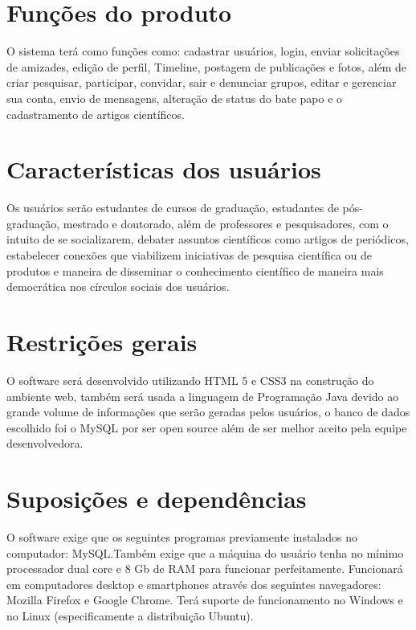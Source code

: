 \section{Funções do produto}

O sistema terá como funções como: cadastrar usuários, login, enviar solicitações de amizades, edição de perfil, Timeline, postagem de publicações e fotos, além de criar pesquisar, participar, convidar, sair e denunciar grupos, editar e gerenciar sua conta, envio de mensagens, alteração de status do bate papo e o cadastramento de artigos científicos.

\section{Características dos usuários}
Os usuários serão estudantes de cursos de graduação, estudantes de pós-graduação, mestrado e doutorado, além de professores e pesquisadores, com o intuito de se socializarem, debater assuntos científicos como artigos de periódicos, estabelecer conexões que viabilizem iniciativas de pesquisa científica ou de produtos e maneira de disseminar o conhecimento científico de maneira mais democrática nos círculos sociais dos usuários.


\section{Restrições gerais}
O software será desenvolvido utilizando HTML 5 e CSS3 na construção do ambiente web, também será usada a linguagem de Programação Java devido ao grande volume de informações que serão geradas pelos usuários, o banco de dados escolhido foi o MySQL por ser open source além de ser melhor aceito pela equipe desenvolvedora.

\section{Suposições e dependências}
O software exige que os seguintes programas previamente instalados no computador: MySQL.Também exige que a máquina do usuário tenha no mínimo processador dual core e 8 Gb de RAM para funcionar perfeitamente. Funcionará em computadores desktop e smartphones através dos seguintes navegadores: Mozilla Firefox e Google Chrome. Terá suporte de funcionamento no Windows e no Linux (especificamente a distribuição Ubuntu).